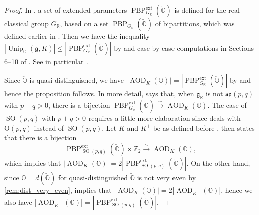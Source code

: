 \documentclass[11pt, a4paper]{amsart}
\newcommand{\g}{\mathfrak{g}}
\newcommand{\orb}{\mathbb{O}}
\newcommand{\Z}{\mathbb{Z}}
\newcommand{\ckorb}{\check{\orb}}
\newcommand{\fso}{\mathfrak{so}}
\newcommand{\Abar}{\bar{A}}
\newcommand{\PBPG}{\PBP_{\GR}(\ckorb)}
\newcommand{\PBPGext}{\PBP_{\GR}^{\mathrm{ext}}(\ckorb)}
\DeclareMathOperator{\AOD}{AOD}
\DeclareMathOperator{\Unip}{Unip}
\DeclareMathOperator{\PBP}{PBP}
\newcommand{\AODK}{\AOD_K}
\newcommand{\UnipOv}{\Unip_{\ckorb}}
\newcommand{\SO}{\operatorname{SO}}
\newcommand{\R}{\mathbb{R}}
\newcommand{\GR}{G_\R}
\theoremstyle{definition}
\numberwithin{equation}{section}
\begin{document}
\begin{proof}
	In \cite[Section 3.2]{BMSZ:construction_unitarity}, a set of extended parameters $\PBPGext$ is defined for the real classical group $\GR$, based on a set $\PBPG$ of bipartitions, which was defined earlier in \cite{BMSZ:counting}. %
	Then we have the inequality $|\UnipOv(\g, K)| \leqslant |\PBPGext|$ by \cite[Corollary 5.4]{BMSZ:counting} and case-by-case computations in Sections 6--10 of \cite{BMSZ:counting}. See in particular \cite[Corollary 8.7]{BMSZ:counting}. 

	Since $\ckorb$ is quasi-distinguished, we have $|\AODK(\orb)| = |\PBPGext|$ by \cite[Proposition 4.11]{BMSZ:construction_unitarity} and hence the proposition follows. In more detail, \cite[Proposition 4.11]{BMSZ:construction_unitarity} says that, when $\g_\R$ is not $\fso(p,q)$ with $p + q > 0$, there is a bijection $\PBPGext \xrightarrow{\scriptstyle\sim} \AODK(\orb)$. The case of $\SO(p,q)$ with $p + q > 0$ requires a little more elaboration since \cite[Proposition 4.11]{BMSZ:construction_unitarity} deals with $\mathrm{O}(p,q)$ instead of $\SO(p,q)$. Let $K$ and $K^+$ be as defined before , then \cite[Proposition 4.11]{BMSZ:construction_unitarity} states that there is a bijection 	
	\[ \PBP_{\SO(p,q)}^{\mathrm{ext}}(\ckorb) \times \Z_2 \xrightarrow{\scriptstyle\sim} \AODK(\orb), \] 
	which implies that $|\AODK(\orb)| = 2|\PBP_{\SO(p,q)}^{\mathrm{ext}}(\ckorb)|$. On the other hand, since $\orb=d(\ckorb)$ for quasi-distinguished $\ckorb$ is not very even by \cref{rem:dist_very_even},  implies that $|\AODK(\orb)| = 2|\AOD_{K^+}(\orb)|$, hence we also have $|\AOD_{K^+}(\orb)| = |\PBP_{\SO(p,q)}^{\mathrm{ext}}(\ckorb)|$.
\end{proof}
\end{document}

